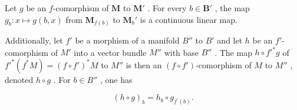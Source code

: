 Let \(g\) be an \(f\)-comorphism of \(\mathbf{M}\) to \(\mathbf{M}'\) . For every \(b \in \mathbf{B}'\) , the map \(g_b: x \mapsto g(b, x)\) from \(\mathbf{M}_{f(b)}\) to \(\mathbf{M}_b'\) is a continuous linear map.

Additionally, let \(f'\) be a morphism of a manifold \(B''\) to \(B'\) and let \(h\) be an \(f'\)-comorphism of \(M'\) into a vector bundle \(M''\) with base \(B''\) . The map \(h \circ f'^{*}g\) of \(f'^{*}(f^{*}M) = (f \circ f')^{*}M\) to \(M''\) is then an \((f \circ f')\)-comorphism of \(M\) to \(M''\) , denoted \(h \circ g\) . For \(b \in B''\) , one has

\[
(h \circ g) _ {b} = h _ {b} \circ g _ {f ^ {\prime} (b)}.
\]

